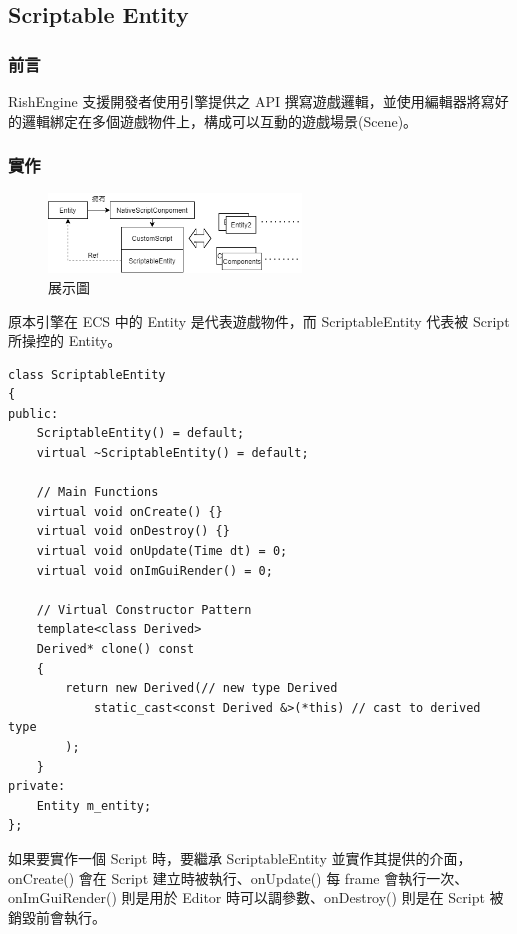 \subsection{Scriptable Entity}
\label{sub:Scriptable Entity}

\subsubsection{前言}
RishEngine 支援開發者使用引擎提供之 API 撰寫遊戲邏輯，並使用編輯器將寫好的邏輯綁定在多個遊戲物件上，構成可以互動的遊戲場景(Scene)。

\subsubsection{實作}
\begin{figure}[h]
    \begin{center}
    \includegraphics[width=0.6\textwidth]{./resources/scriptable/implement.png}
    \end{center}
\caption{展示圖}
\label{fig:implement}
\end{figure}

原本引擎在 ECS 中的 Entity 是代表遊戲物件，而 ScriptableEntity 代表被 Script 所操控的 Entity。

\begin{lstlisting}
class ScriptableEntity
{
public:
    ScriptableEntity() = default;
    virtual ~ScriptableEntity() = default;

    // Main Functions
    virtual void onCreate() {}
    virtual void onDestroy() {}
    virtual void onUpdate(Time dt) = 0;
    virtual void onImGuiRender() = 0;

    // Virtual Constructor Pattern
    template<class Derived>
    Derived* clone() const
    {
        return new Derived(// new type Derived
            static_cast<const Derived &>(*this) // cast to derived type
        );
    }
private:
    Entity m_entity;
};
\end{lstlisting}

如果要實作一個 Script 時，要繼承 ScriptableEntity 並實作其提供的介面，onCreate() 會在 Script 建立時被執行、onUpdate() 每 frame 會執行一次、onImGuiRender() 則是用於 Editor 時可以調參數、onDestroy() 則是在 Script 被銷毀前會執行。

